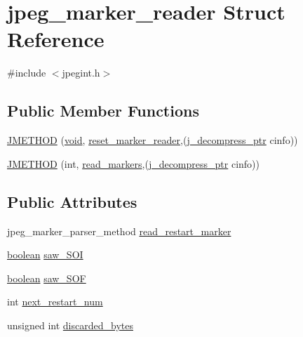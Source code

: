 \hypertarget{structjpeg__marker__reader}{}\section{jpeg\+\_\+marker\+\_\+reader Struct Reference}
\label{structjpeg__marker__reader}


{\ttfamily \#include $<$jpegint.\+h$>$}

\subsection*{Public Member Functions}
\begin{DoxyCompactItemize}
\item 
\hyperlink{structjpeg__marker__reader_af23250da87f9da190c88459aa565f2b1}{J\+M\+E\+T\+H\+O\+D} (\hyperlink{png_8h_aa8c59027f9ab2769342f248709d68d17}{void}, \hyperlink{jdmarker_8c_a1c08f1ba460e1a19d2dbc877b47c8b5f}{reset\+\_\+marker\+\_\+reader},(\hyperlink{jpeglib_8h_a00c7d78af44bd26a901c791ccfc1e178}{j\+\_\+decompress\+\_\+ptr} cinfo))
\item 
\hyperlink{structjpeg__marker__reader_a6a2541cbeb37477c71ba6bc237e559a1}{J\+M\+E\+T\+H\+O\+D} (int, \hyperlink{jdmarker_8c_a8ff81a078a99e98efe6051366512c5f6}{read\+\_\+markers},(\hyperlink{jpeglib_8h_a00c7d78af44bd26a901c791ccfc1e178}{j\+\_\+decompress\+\_\+ptr} cinfo))
\end{DoxyCompactItemize}
\subsection*{Public Attributes}
\begin{DoxyCompactItemize}
\item 
jpeg\+\_\+marker\+\_\+parser\+\_\+method \hyperlink{structjpeg__marker__reader_a23e67f5a0fa37ea69483dad72217123e}{read\+\_\+restart\+\_\+marker}
\item 
\hyperlink{jmorecfg_8h_a7c6368b321bd9acd0149b030bb8275ed}{boolean} \hyperlink{structjpeg__marker__reader_ad67711d91054e97e76fbe5254aac644c}{saw\+\_\+\+S\+O\+I}
\item 
\hyperlink{jmorecfg_8h_a7c6368b321bd9acd0149b030bb8275ed}{boolean} \hyperlink{structjpeg__marker__reader_a1bf77ef7dfb6dfe58a03d041eb0dcd40}{saw\+\_\+\+S\+O\+F}
\item 
int \hyperlink{structjpeg__marker__reader_aac8d40171c73a18f129cd1b62d2fd06b}{next\+\_\+restart\+\_\+num}
\item 
unsigned int \hyperlink{structjpeg__marker__reader_ad29dee6159ab74f195fe5d88139306ce}{discarded\+\_\+bytes}
\end{DoxyCompactItemize}


